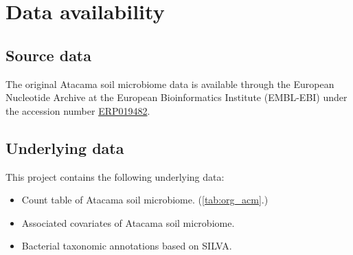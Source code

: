 \documentclass[10pt,a4paper]{article}
\let\cite\citep
\begin{document}





\section*{Data availability} %


\subsection*{Source data}
The original Atacama soil microbiome data \cite{neilson2017significant} is available through the European Nucleotide Archive at the European Bioinformatics Institute (EMBL-EBI) under the accession number \href{https://www.ebi.ac.uk/ena/browser/view/PRJEB17617}{ERP019482}.


\subsection*{Underlying data}

This project contains the following underlying data:
\begin{itemize}
	\item Count table of Atacama soil microbiome. (\autoref{tab:org_acm}.)
	\item Associated covariates of Atacama soil microbiome.
    \item Bacterial taxonomic annotations based on SILVA.
\end{itemize}
\end{document}
